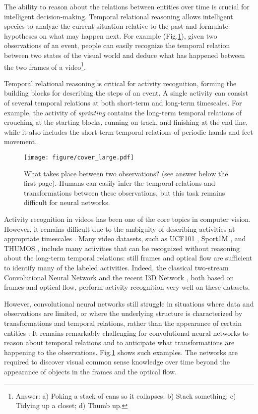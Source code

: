 \documentclass[runningheads]{llncs}
\begin{document}
The ability to reason about the relations between entities over time is crucial for intelligent decision-making. Temporal relational reasoning allows intelligent species to analyze the current situation relative to the past and formulate hypotheses on what may happen next. For example (Fig.\ref{cover}), given two observations of an event, people can easily recognize the temporal relation between two states of the visual world and deduce what has happened between the two frames of a video\footnote{Answer: a) Poking a stack of cans so it collapses; b) Stack something; c) Tidying up a closet; d) Thumb up.}.

Temporal relational reasoning is critical for activity recognition, forming the building blocks for describing the steps of an event. A single activity can consist of several temporal relations at both short-term and long-term timescales. For example, the activity of \textit{sprinting} contains the long-term temporal relations of crouching at the starting blocks, running on track, and finishing at the end line, while it also includes the short-term temporal relations of periodic hands and feet movement.

\begin{figure}
\texttt{[image: figure/cover\_large.pdf]}
\caption{What takes place between two observations? (see answer below the first page). Humans can easily infer the temporal relations and transformations between these observations, but this task remains difficult for neural networks.}
\label{cover}
\vspace{-5mm}
\end{figure}

Activity recognition in videos has been one of the core topics in computer vision. However, it remains difficult due to the ambiguity of describing activities at appropriate timescales \cite{sigurdsson2017actions}. Many video datasets, such as UCF101 \cite{soomro2012ucf101}, Sport1M \cite{karpathy2014large}, and THUMOS \cite{gorban2015thumos}, include many activities that can be recognized without reasoning about the long-term temporal relations: still frames and optical flow are sufficient to identify many of the labeled activities. Indeed, the classical two-stream Convolutional Neural Network \cite{simonyan2014two} and the recent I3D Network \cite{carreira2017quo}, both based on frames and optical flow, perform activity recognition very well on these datasets. 

However, convolutional neural networks still struggle in situations where data and observations are limited, or where the underlying structure is characterized by transformations and temporal relations, rather than the appearance of certain entities \cite{santoro2017simple,lake2016building}. It remains remarkably challenging for convolutional neural networks to reason about temporal relations and to anticipate what transformations are happening to the observations. Fig.\ref{cover} shows such examples. The networks are required to discover visual common sense knowledge over time beyond the appearance of objects in the frames and the optical flow.
\end{document}
